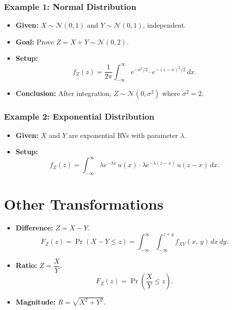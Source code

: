 \documentclass{article}
\begin{document}
\subsubsection*{Example 1: Normal Distribution}
\begin{itemize}
    \item \textbf{Given:} $X \sim \mathcal{N}(0,1)$ and $Y \sim \mathcal{N}(0,1)$, 
          independent.
    \item \textbf{Goal:} Prove $Z = X + Y \sim \mathcal{N}(0,2)$.
    \item \textbf{Setup:}
    \[
        f_Z(z) = \frac{1}{2\pi}\int_{-\infty}^{\infty}
                 e^{-x^2/2}\cdot e^{-(z-x)^2/2}\,dx.
    \]
    \item \textbf{Conclusion:} After integration, $Z \sim \mathcal{N}(0,\sigma^2)$ 
          where $\sigma^2 = 2$.
\end{itemize}

\subsubsection*{Example 2: Exponential Distribution}
\begin{itemize}
    \item \textbf{Given:} $X$ and $Y$ are exponential RVs with parameter $\lambda$.
    \item \textbf{Setup:}
    \[
        f_Z(z) = \int_{-\infty}^{\infty}
                 \lambda e^{-\lambda x}\,u(x)\cdot
                 \lambda e^{-\lambda(z-x)}\,u(z-x)\,dx.
    \]
\end{itemize}

\section{Other Transformations}

\begin{itemize}
    \item \textbf{Difference:} $Z = X - Y$.
    \[
        F_Z(z) = \Pr(X - Y \leq z)
               = \int_{-\infty}^{\infty}\int_{-\infty}^{z+y}
                 f_{XY}(x,\,y)\,dx\,dy.
    \]

    \item \textbf{Ratio:} $Z = \dfrac{X}{Y}$.
    \[
        F_Z(z) = \Pr\!\left(\frac{X}{Y} \leq z\right).
    \]

    \item \textbf{Magnitude:} $R = \sqrt{X^2 + Y^2}$.
\end{itemize}
\end{document}

